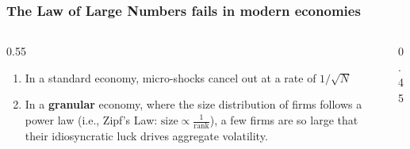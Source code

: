 \documentclass[aspectratio=169,11pt]{beamer}
\begin{document}
\begin{frame}[label=src_sqrtn]
    \frametitle{The Law of Large Numbers fails in modern economies}
    \begin{columns}[T]
        \begin{column}{0.55\textwidth}


            \vspace{0.8cm}
            \begin{enumerate}
                \item {In a standard economy, micro-shocks cancel out at a rate of $1/\sqrt{N}$ \hyperlink{app_sqrtn}{}
                      \vspace{0.4cm}}
                \item {In a \textbf{granular} economy, where the size distribution of firms follows a power law (i.e., Zipf's Law: $\text{size} \propto \frac{1}{\text{rank}}$), a few firms are so large that their idiosyncratic luck drives aggregate volatility.}
            \end{enumerate}
        \end{column}

        \begin{column}{0.45\textwidth}
        \end{column}
    \end{columns}

\end{frame}
\end{document}
